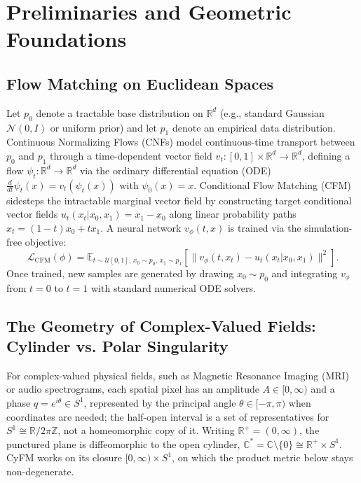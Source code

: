 \section{Preliminaries and Geometric Foundations}
\label{sec:preliminaries}

\subsection{Flow Matching on Euclidean Spaces}
Let $p_0$ denote a tractable base distribution on $\mathbb{R}^d$ (e.g., standard Gaussian $\mathcal{N}(0, I)$ or uniform prior) and let $p_1$ denote an empirical data distribution. Continuous Normalizing Flows (CNFs) model continuous-time transport between $p_0$ and $p_1$ through a time-dependent vector field $v_t: [0, 1] \times \mathbb{R}^d \to \mathbb{R}^d$, defining a flow $\psi_t: \mathbb{R}^d \to \mathbb{R}^d$ via the ordinary differential equation (ODE) $\frac{d}{dt} \psi_t(x) = v_t(\psi_t(x))$ with $\psi_0(x) = x$. Conditional Flow Matching (CFM) \citep{lipman2023flow, albergo2023building, liu2023flow} sidesteps the intractable marginal vector field by constructing target conditional vector fields $u_t(x_t|x_0, x_1) = x_1 - x_0$ along linear probability paths $x_t = (1 - t) x_0 + t x_1$. A neural network $v_\phi(t, x)$ is trained via the simulation-free objective:
\begin{equation}
    \mathcal{L}_{\mathrm{CFM}}(\phi) = \mathbb{E}_{t \sim \mathcal{U}[0, 1],\, x_0 \sim p_0,\, x_1 \sim p_1} \left[ \| v_\phi(t, x_t) - u_t(x_t | x_0, x_1) \|^2 \right].
\end{equation}
Once trained, new samples are generated by drawing $x_0 \sim p_0$ and integrating $v_\phi$ from $t=0$ to $t=1$ with standard numerical ODE solvers.

\subsection{The Geometry of Complex-Valued Fields: Cylinder vs. Polar Singularity}
For complex-valued physical fields, such as Magnetic Resonance Imaging (MRI) or audio spectrograms, each spatial pixel has an amplitude $A \in [0, \infty)$ and a phase $q = e^{i\theta} \in S^1$, represented by the principal angle $\theta \in [-\pi, \pi)$ when coordinates are needed; the half-open interval is a set of representatives for $S^1 \cong \mathbb{R} / 2\pi\mathbb{Z}$, not a homeomorphic copy of it. Writing $\mathbb{R}^+ = (0, \infty)$, the punctured plane is diffeomorphic to the open cylinder, $\mathbb{C}^* = \mathbb{C} \setminus \{0\} \cong \mathbb{R}^+ \times S^1$. CyFM works on its closure $[0, \infty) \times S^1$, on which the product metric below stays non-degenerate.

